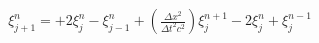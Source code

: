 \documentclass[preview]{standalone}
\begin{document}
\begin{align*}
\xi_{j+1}^{n} =  + 2 \xi_{j}^{n} - \xi_{j-1}^{n} +  \left(\frac{\Delta x^2}{\Delta t^2c^2}\right) \xi_{j}^{n+1} - 2 \xi_{j}^{n} + \xi_{j}^{n-1}
\end{align*}
\end{document}

